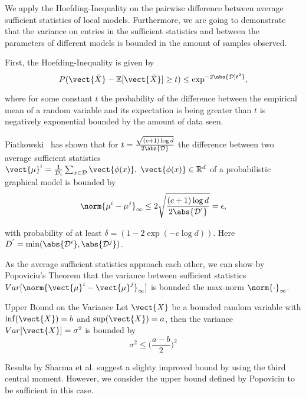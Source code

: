We apply the Hoefding-Inequality on the pairwise difference between average sufficient statistics of local models.
Furthermore, we are going to demonstrate that the variance on entries in the sufficient statistics and between the parameters of different models is bounded in the amount of samples observed.

First, the Hoefding-Inequality is given by
\begin{equation}
    P(\vect{\bar{X}} - \mathbb{E}[\vect{\bar{X}}] \geq t ) \leq \exp^{-2\abs{\mathcal{D}]t^2}},
\end{equation}

where for some constant $t$ the probability of the difference between the empirical mean of a random variable and its expectation is being greater than $t$ is negatively exponential bounded by the amount of data seen.

Piatkowski~\cite{piatkowski2019distributed} has shown that for $t = \frac{\sqrt{(c+1) \log d}}{2\abs{\mathcal{D}}}$ the difference between two average sufficient statistics $\vect{\mu}^i = \frac{1}{\mathcal{D}_i} \sum_{x \in \mathcal{D}} \vect{\phi(x)}, \; \vect{\phi(x)} \in \mathbb{R}^d$ of a probabilistic graphical model is bounded by
\begin{equation}
    \label{eq:hoefd}
    \norm{\mu^{i} -  \mu^{j}}_\infty \leq 2 \sqrt{
        \frac{(c+1) \log d}
        {2\abs{\mathcal{D^{'}}}}
        } = \epsilon,
\end{equation}

with probability of at least $\delta= (1- 2 \exp(-c \log d))$. Here $D^{'} = \min(\abs{\mathcal{D}^i}, \abs{\mathcal{D}^j})$.

As the average sufficient statistics approach each other, we can show by Popoviciu's Theorem \cite{popoviciu1935equations} that the variance between sufficient statistics $Var[\norm{\vect{\mu}^{i} -  \vect{\mu}^{j}}_\infty]$ is bounded \wrt the max-norm $\norm{\cdot}_{\infty}$.
\begin{threm}{Upper Bound on the Variance}
    Let $\vect{X}$ be a bounded random variable with $\inf(\vect{X}) = b$ and $\sup(\vect{X}) = a$, 
    then the variance $Var[\vect{X}] = \sigma^2$ is bounded by 
    \begin{equation}
        \sigma^2 \leq \bigg(\frac{a-b}{2}\bigg)^{2}
    \end{equation}
\end{threm}

Results by Sharma et al. \cite{sharma2010betterbounds} suggest a slighty improved bound by using the third central moment.
However, we consider the upper bound defined by Popoviciu to be sufficient in this case.


